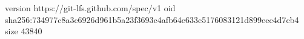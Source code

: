 version https://git-lfs.github.com/spec/v1
oid sha256:734977c8a3c6926d961b5a23f3693c4afb64e633c5176083121d899eec4d7cb4
size 43840
